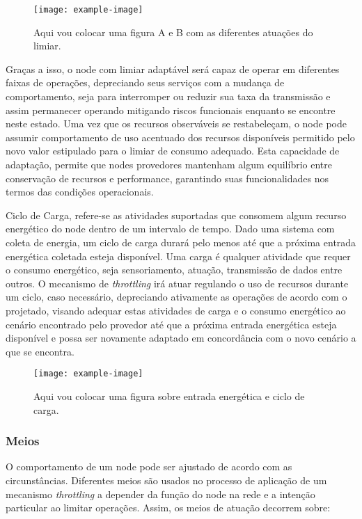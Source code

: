 \begin{itemize}
    \begin{figure}[h]
    	\centering
    	\texttt{[image: example-image]} 
    	\caption{Aqui vou colocar uma figura A e B com as diferentes atuações do limiar.}
    \end{figure}
    
    Graças a isso, o node com limiar adaptável será capaz de operar em diferentes faixas de operações, depreciando seus serviços com a mudança de comportamento, seja para interromper ou reduzir sua taxa da transmissão e assim permanecer operando mitigando riscos funcionais enquanto se encontre neste estado. Uma vez que os recursos observáveis se restabeleçam, o node pode assumir comportamento de uso acentuado dos recursos disponíveis permitido pelo novo valor estipulado para o limiar de consumo adequado. Esta capacidade de adaptação, permite que nodes provedores mantenham algum equilíbrio entre conservação de recursos e performance, garantindo suas funcionalidades nos termos das condições operacionais.
    
      
 
    
\end{itemize}


Ciclo de Carga, refere-se as atividades suportadas que consomem algum recurso energético do node dentro de um intervalo de tempo. Dado uma sistema com coleta de energia, um ciclo de carga durará pelo menos até que a próxima entrada energética coletada esteja disponível.  Uma carga é qualquer atividade que requer o consumo energético, seja sensoriamento, atuação, transmissão de dados entre outros. O mecanismo de \textit{throttling} irá atuar regulando o uso de recursos durante um ciclo, caso necessário, depreciando ativamente as operações de acordo com o projetado, visando adequar estas atividades de carga e o consumo energético ao cenário encontrado pelo provedor até que a próxima entrada energética esteja disponível e possa ser novamente adaptado em concordância com o novo cenário a que se encontra.

   \begin{figure}[h]
	\centering
	\noindent\texttt{[image: example-image]} 
	\caption{Aqui vou colocar uma figura sobre entrada energética e ciclo de carga.}
\end{figure}


\subsubsection{Meios}
O comportamento de um node pode ser ajustado de acordo com as circunstâncias. Diferentes meios são usados no processo de aplicação de um mecanismo \textit{throttling} a depender da função do node na rede e a intenção particular ao limitar operações. Assim, os meios de atuação decorrem sobre:

